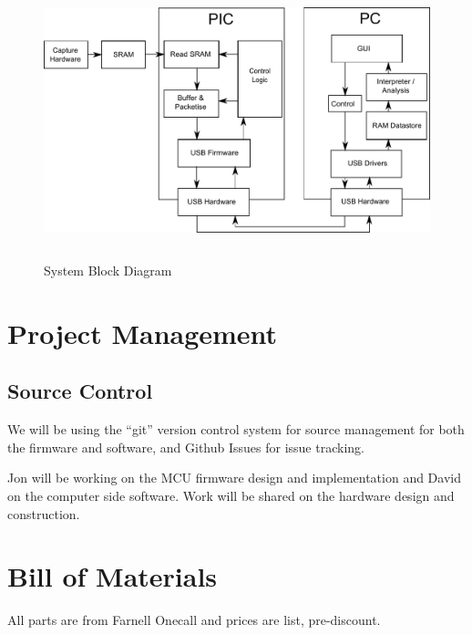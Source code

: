 \documentclass[11pt]{article}
\begin{document}
    \begin{figure}
    \centering
    \includegraphics[height=8cm]{block-diagram.pdf}
    \caption{System Block Diagram}
    \label{fig:app}
    \end{figure}

\section{Project Management}
\subsection{Source Control}
    We will be using the ``git'' version control system for source management for both the firmware and software, and Github Issues for issue tracking.

    Jon will be working on the MCU firmware design and implementation and David on the computer side software. Work will be shared on the hardware design and construction.
	
\appendix
\appendixpage
\addappheadtotoc

\section{Bill of Materials}
    All parts are from Farnell Onecall and prices are list, pre-discount.
\end{document}

